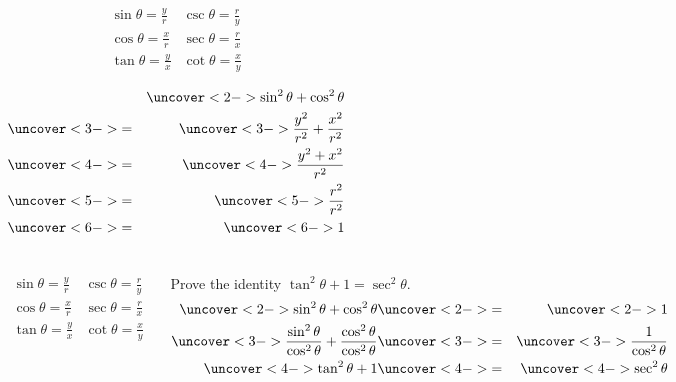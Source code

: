 \begin{frame}
\begin{columns}[c]
\trigIdentitiesPicture

\[
\begin{array}{cc}
\sin \theta = \frac{ y}{ r} &
\csc \theta = \frac{ r}{ y} \\
\cos \theta = \frac{ x}{ r} &
\sec \theta = \frac{ r}{ x} \\
\tan \theta = \frac{ y}{ x} &
\cot \theta = \frac{ x}{ y} \\
\end{array}
\]
\begin{eqnarray*}
& & \uncover<2->{\sin^2 \theta + \cos^2 \theta}\\
& \uncover<3->{=} & \uncover<3->{\frac{y^2}{r^2} + \frac{x^2}{r^2}}\\
& \uncover<4->{=} & \uncover<4->{\frac{y^2+x^2}{r^2}}\\
& \uncover<5->{=} & \uncover<5->{\frac{r^2}{r^2}}\\
& \uncover<6->{=} & \uncover<6->{1}
\end{eqnarray*}
%
\end{columns}
\end{frame}


\begin{frame}
\begin{columns}[c]
\trigIdentitiesPicture
\[
\begin{array}{cc}
\sin \theta = \frac{ y}{ r} &
\csc \theta = \frac{ r}{ y} \\
\cos \theta = \frac{ x}{ r} &
\sec \theta = \frac{ r}{ x} \\
\tan \theta = \frac{ y}{ x} &
\cot \theta = \frac{ x}{ y} \\
\end{array}
\]
\begin{example}[$\tan^2 \theta + 1 = \sec^2 \theta$]
Prove the identity $\tan^2 \theta + 1 = \sec^2 \theta$.
\begin{eqnarray*}
\uncover<2->{\sin^2 \theta + \cos^2 \theta} & \uncover<2->{=} & \uncover<2->{1}\\
\uncover<3->{\frac{\sin^2 \theta}{\cos^2\theta} + \frac{\cos^2 \theta}{\cos^2\theta}} & \uncover<3->{=} & \uncover<3->{\frac{1}{\cos^2\theta}}\\
\uncover<4->{\tan^2 \theta + 1} & \uncover<4->{=} & \uncover<4->{\sec^2\theta}
\end{eqnarray*}
\end{example}
\end{columns}
\end{frame}



